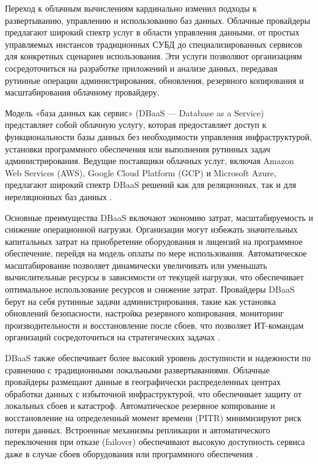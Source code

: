 \documentclass{SibFU-docs}
\begin{document}
Переход к облачным вычислениям кардинально изменил подходы к развертыванию, управлению и использованию баз данных. Облачные провайдеры предлагают широкий спектр услуг в области управления данными, от простых управляемых инстансов традиционных СУБД до специализированных сервисов для конкретных сценариев использования. Эти услуги позволяют организациям сосредоточиться на разработке приложений и анализе данных, передавая рутинные операции администрирования, обновления, резервного копирования и масштабирования облачному провайдеру.


Модель «база данных как сервис» (DBaaS — Database as a Service) представляет собой облачную услугу, которая предоставляет доступ к функциональности базы данных без необходимости управления инфраструктурой, установки программного обеспечения или выполнения рутинных задач администрирования. Ведущие поставщики облачных услуг, включая Amazon Web Services (AWS), Google Cloud Platform (GCP) и Microsoft Azure, предлагают широкий спектр DBaaS решений как для реляционных, так и для нереляционных баз данных \cite{cockroach}.

Основные преимущества DBaaS включают экономию затрат, масштабируемость и снижение операционной нагрузки. Организации могут избежать значительных капитальных затрат на приобретение оборудования и лицензий на программное обеспечение, перейдя на модель оплаты по мере использования. Автоматическое масштабирование позволяет динамически увеличивать или уменьшать вычислительные ресурсы в зависимости от текущей нагрузки, что обеспечивает оптимальное использование ресурсов и снижение затрат. Провайдеры DBaaS берут на себя рутинные задачи администрирования, такие как установка обновлений безопасности, настройка резервного копирования, мониторинг производительности и восстановление после сбоев, что позволяет ИТ-командам организаций сосредоточиться на стратегических задачах \cite{clickhousedocs}.

DBaaS также обеспечивает более высокий уровень доступности и надежности по сравнению с традиционными локальными развертываниями. Облачные провайдеры размещают данные в географически распределенных центрах обработки данных с избыточной инфраструктурой, что обеспечивает защиту от локальных сбоев и катастроф. Автоматическое резервное копирование и восстановление на определенный момент времени (PITR) минимизируют риск потери данных. Встроенные механизмы репликации и автоматического переключения при отказе (failover) обеспечивают высокую доступность сервиса даже в случае сбоев оборудования или программного обеспечения \cite{cockroach}.
\end{document}
